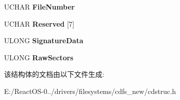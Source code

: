 \begin{DoxyCompactItemize}
\item 
\mbox{\label{struct___r_i_f_f___h_e_a_d_e_r_a0341b6c7513e27d67309da81c38456e1}} 
U\+C\+H\+AR {\bfseries File\+Number}
\item 
\mbox{\label{struct___r_i_f_f___h_e_a_d_e_r_a4c9087c4449d7776b5219625dd2fa5b7}} 
U\+C\+H\+AR {\bfseries Reserved} \mbox{[}7\mbox{]}
\item 
\mbox{\label{struct___r_i_f_f___h_e_a_d_e_r_af1beba5e309c3172cbc1f61f693bab67}} 
U\+L\+O\+NG {\bfseries Signature\+Data}
\item 
\mbox{\label{struct___r_i_f_f___h_e_a_d_e_r_af1322775d15a3309cd1a34f5d1926c58}} 
U\+L\+O\+NG {\bfseries Raw\+Sectors}
\end{DoxyCompactItemize}


该结构体的文档由以下文件生成\+:\begin{DoxyCompactItemize}
\item 
E\+:/\+React\+O\+S-\/0../drivers/filesystems/cdfs\+\_\+new/cdstruc.\+h\end{DoxyCompactItemize}
